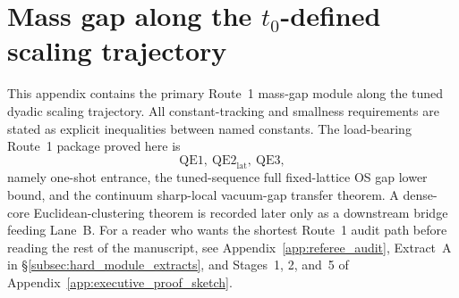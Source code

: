\section{Mass gap along the \texorpdfstring{$t_0$}{t0}-defined scaling trajectory}
\label{app:route1}

This appendix contains the primary Route~1 mass-gap module along the tuned dyadic scaling trajectory.
All constant-tracking and smallness requirements are stated as explicit inequalities between named constants.
The load-bearing Route~1 package proved here is
\[
\mathrm{QE1},\ \mathrm{QE2}_{\mathrm{lat}},\ \mathrm{QE3},
\]
namely one-shot entrance, the tuned-sequence full fixed-lattice OS gap lower bound, and the continuum sharp-local vacuum-gap transfer theorem.
A dense-core Euclidean-clustering theorem is recorded later only as a downstream bridge feeding Lane~B.
For a reader who wants the shortest Route~1 audit path before reading the rest of the manuscript, see Appendix~\ref{app:referee_audit}, Extract~A in \S\ref{subsec:hard_module_extracts}, and Stages~1, 2, and~5 of Appendix~\ref{app:executive_proof_sketch}.

